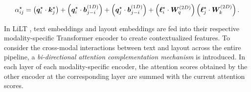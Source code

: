 \begin{equation}
    \alpha^{\star}_{ij} = \left(\bm{q}^{\star}_i \cdot \bm{k}^{\star}_j\right) + \left(\bm{q}^{\star}_i \cdot \bm{b}^{(1D)}_{j-i}\right) + \left(\bm{q}^{\star}_j \cdot \bm{b}^{(1D)}_{j-i}\right) + \left(\boldsymbol{\ell}^{\star}_i \cdot \bm{W}^{(2D)}_q \right) \left(\boldsymbol{\ell}^{\star}_j \cdot \bm{W}^{(2D)}_k \right).
\end{equation}






In \ac{LiLT} \citep{wang2022lilt}, text embeddings and layout embeddings are fed into their respective modality-specific Transformer encoder to create contextualized features. To consider the cross-modal interactions between text and layout across the entire pipeline, a \textit{bi-directional attention complementation mechanism} is introduced. In each layer of each modality-specific encoder, the attention scores obtained by the other encoder at the corresponding layer are summed with the current attention scores.  

